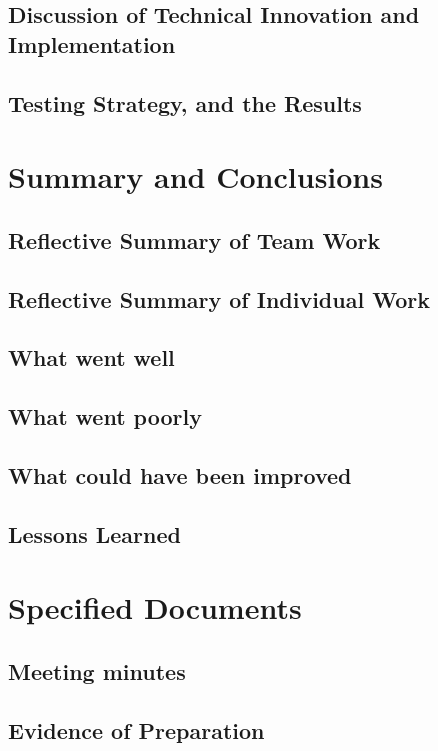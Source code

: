 \documentclass[a4paper]{report}
\begin{document}
\section{Discussion of Technical Innovation and Implementation}
\section{Testing Strategy, and the Results}

\chapter{Summary and Conclusions}
\section{Reflective Summary of Team Work}
\section{Reflective Summary of Individual Work}
\section{What went well}
\section{What went poorly}
\section{What could have been improved}
\section{Lessons Learned}

\chapter{Specified Documents}
\section{Meeting minutes}
\section{Evidence of Preparation}
\end{document}
